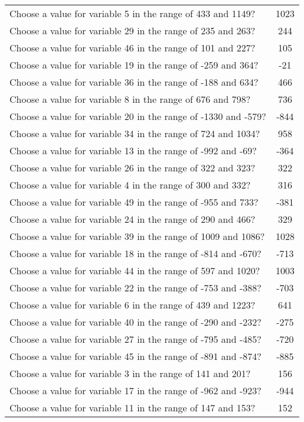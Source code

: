 \documentclass[10pt,a4paper]{article}
\begin{document}
\begin{appendix}
\begin{tabular}{ l  c }
\\Choose a value for variable 5 in the range of 433 and 1149? & 1023
\\Choose a value for variable 29 in the range of 235 and 263? & 244
\\Choose a value for variable 46 in the range of 101 and 227? & 105
\\Choose a value for variable 19 in the range of -259 and 364? & -21
\\Choose a value for variable 36 in the range of -188 and 634? & 466
\\Choose a value for variable 8 in the range of 676 and 798? & 736
\\Choose a value for variable 20 in the range of -1330 and -579? & -844
\\Choose a value for variable 34 in the range of 724 and 1034? & 958
\\Choose a value for variable 13 in the range of -992 and -69? & -364
\\Choose a value for variable 26 in the range of 322 and 323? & 322
\\Choose a value for variable 4 in the range of 300 and 332? & 316
\\Choose a value for variable 49 in the range of -955 and 733? & -381
\\Choose a value for variable 24 in the range of 290 and 466? & 329
\\Choose a value for variable 39 in the range of 1009 and 1086? & 1028
\\Choose a value for variable 18 in the range of -814 and -670? & -713
\\Choose a value for variable 44 in the range of 597 and 1020? & 1003
\\Choose a value for variable 22 in the range of -753 and -388? & -703
\\Choose a value for variable 6 in the range of 439 and 1223? & 641
\\Choose a value for variable 40 in the range of -290 and -232? & -275
\\Choose a value for variable 27 in the range of -795 and -485? & -720
\\Choose a value for variable 45 in the range of -891 and -874? & -885
\\Choose a value for variable 3 in the range of 141 and 201? & 156
\\Choose a value for variable 17 in the range of -962 and -923? & -944
\\Choose a value for variable 11 in the range of 147 and 153? & 152

\end{tabular}
\end{appendix}
\end{document}
